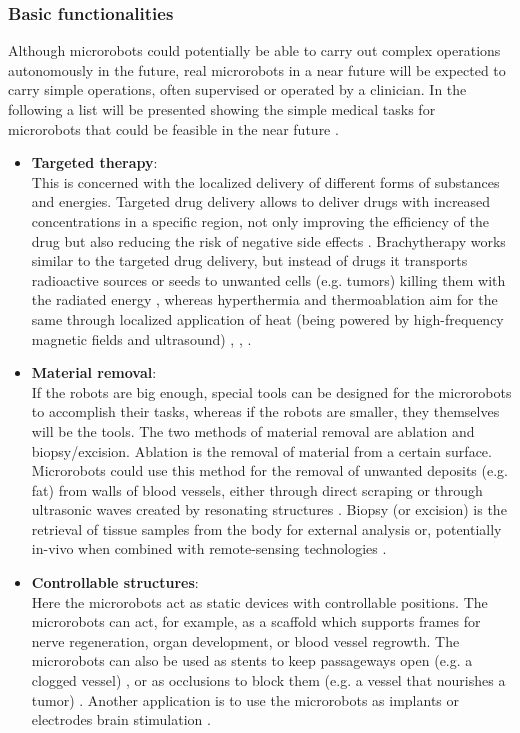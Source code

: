 \subsubsection{Basic functionalities}

Although microrobots could potentially be able to carry out complex operations autonomously in the future, real microrobots in a near future will be expected to carry simple operations, often supervised or operated by a clinician. In the following a list will be presented showing the simple medical tasks for microrobots that could be feasible in the near future \cite{Nelson2010}.
\begin{itemize}
\item \textbf{Targeted therapy}: \\ This is concerned with the localized delivery of different forms of substances and energies. Targeted drug delivery allows to deliver drugs with increased concentrations in a specific region, not only improving the efficiency of the drug but also reducing the risk of negative side effects \cite{Nelson2010}. Brachytherapy works similar to the targeted drug delivery, but instead of drugs it transports radioactive sources or seeds to unwanted cells (e.g. tumors) killing them with the radiated energy \cite{Devlin2007}, whereas hyperthermia and thermoablation aim for the same through localized application of heat (being powered by high-frequency magnetic fields and ultrasound) \cite{Andra2007}, \cite{Kobayashi2011}, \cite{Baronzio2009}. 


\item \textbf{Material removal}: \\ If the robots are big enough, special tools can be designed for the microrobots to accomplish their tasks, whereas if the robots are smaller, they themselves will be the tools.\cite{Nelson2010} The two methods of material removal are ablation and biopsy/excision. Ablation is the removal of material from a certain surface. Microrobots could use this method for the removal of unwanted deposits (e.g. fat) from walls of blood vessels, either through direct scraping or through ultrasonic waves  created by resonating structures \cite{Tabatabaei2011}. Biopsy (or excision) is the retrieval of tissue samples from the body for external analysis or, potentially in-vivo when combined with remote-sensing technologies \cite{Nelson2010}.

\item \textbf{Controllable structures}: \\ Here the microrobots act as static devices with controllable positions. The microrobots can act, for example, as a scaffold \cite{Zhang2005} which supports frames for nerve regeneration, organ development, or blood vessel regrowth. The microrobots can also be used as stents to keep passageways open (e.g. a clogged vessel) \cite{Ormiston2009}, \cite{Lally2006} or as occlusions to block them (e.g. a vessel that nourishes a tumor) \cite{Fabbrini2006}. Another application is to use the microrobots as implants or electrodes brain stimulation \cite{Polikov2005}.



\end{itemize}
